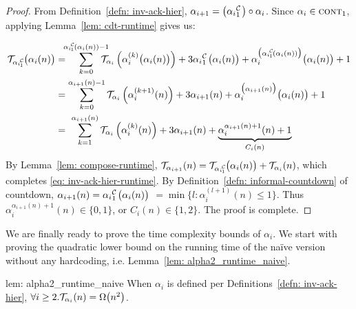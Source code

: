 \begin{proof}
	 From Definition~\ref{defn: inv-ack-hier}, $\alpha_{i+1} = \big(\cdt{\alpha_i}{1}\big)\circ \alpha_i$. Since $\alpha_i\in \text{\scshape{cont}}_{1}$, applying Lemma~\ref{lem: cdt-runtime} gives us:

	 \begin{equation*}
	 \begin{aligned}
	 \runtime_{\cdt{\alpha_i}{1}}\big(\alpha_i(n)\big)
	 & = \hspace{-5pt} \sum_{k=0}^{\cdt{\alpha_i}{1}(\alpha_i(n)) - 1} \hspace{-10pt} \runtime_{\alpha_i}\left(\alpha_i^{(k)}\big(\alpha_i(n)\big)\right)
	 + 3\cdt{\alpha_i}{1}\big(\alpha_i(n)\big)
	 + \alpha_i^{\big(\cdt{\alpha_i}{1}(\alpha_i(n))\big)}\big(\alpha_i(n)\big) + 1 \\
	 & = \sum_{k=0}^{\alpha_{i+1}(n) - 1} \runtime_{\alpha_i}\left(\alpha_i^{(k+1)}(n)\right)
	 + 3\alpha_{i+1}(n)
	 + \alpha_i^{\big(\alpha_{i+1}(n)\big)}\big(\alpha_i(n)\big) + 1 \\
	 & = \ \sum_{k=1}^{\alpha_{i+1}(n)} \runtime_{\alpha_i}\left(\alpha_i^{(k)}(n)\right)
	 + 3\alpha_{i+1}(n)
	 + \underbrace{\alpha_i^{\alpha_{i+1}(n) + 1}(n) + 1}_{C_i(n)}
	 \end{aligned}
	 \end{equation*}By Lemma~\ref{lem: compose-runtime}, $\runtime_{\alpha_{i+1}}(n) = \runtime_{\cdt{\alpha_i}{1}}\big(\alpha_i(n)\big) + \runtime_{\alpha_i}(n)$, which completes \eqref{eq: inv-ack-hier-runtime}. By Definition~\ref{defn: informal-countdown} of countdown, $\alpha_{i+1}(n) = \cdt{\alpha_i}{1}\big(\alpha_i(n)\big)$
	 $= \min\big\{l: \alpha_i^{(l+1)}(n)\le 1\big\}$. Thus $\alpha_i^{\alpha_{i+1}(n) + 1}(n) \in \{0, 1\}$, or $C_i(n)\in \{1, 2\}$. The proof is complete.
\end{proof}

\noindent We are finally ready to prove the time complexity bounds of $\alpha_i$. We start with proving the quadratic lower bound on the running time of the na\"ive version without any hardcoding, i.e. Lemma~\ref{lem: alpha2_runtime_naive}.

\begin{uselemcounterof}{lem: alpha2_runtime_naive}
	When $\alpha_i$ is defined per Definitions~\ref{defn: inv-ack-hier}, $\forall i\ge 2. \mathcal{T}_{\alpha_i}(n) = \Omega\big(n^2\big)$.
\end{uselemcounterof}

